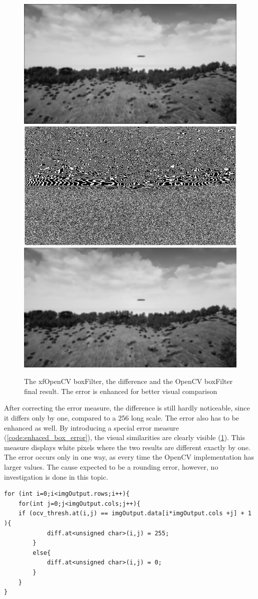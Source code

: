 \begin{figure}[b]
    \centering
    \includegraphics[width=.32\linewidth]{images/box_filter/HLS_img.jpg}
    \includegraphics[width=.32\linewidth]{images/box_filter/diff_img.jpg}
    \includegraphics[width=.32\linewidth]{images/box_filter/OCV_img.jpg}
    \caption{The xfOpenCV boxFilter, the difference and the OpenCV boxFilter final result. The error is enhanced for better visual comparison}
    \label{fig:box_error}
\end{figure}

After correcting the error measure, the difference is still hardly noticeable, since it differs only by one, compared to a 256 long scale.
The error also has to be enhanced as well.
By introducing a special error measure (\cref{code:enhaced_box_error}), the visual similarities are clearly visible (\cref{fig:box_error}).
This measure displays white pixels where the two results are different exactly by one.
The error occurs only in one way, as every time the OpenCV implementation has larger values.
The cause expected to be a rounding error, however, no investigation is done in this topic.

\begin{lstlisting}
for (int i=0;i<imgOutput.rows;i++){
	for(int j=0;j<imgOutput.cols;j++){
	if (ocv_thresh.at(i,j) == imgOutput.data[i*imgOutput.cols +j] + 1 ){
			diff.at<unsigned char>(i,j) = 255;
		}
		else{
			diff.at<unsigned char>(i,j) = 0;
		}
	}
}
\end{lstlisting}

